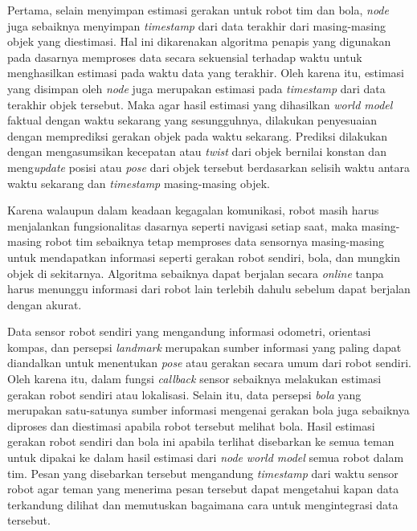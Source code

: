 Pertama, selain menyimpan estimasi gerakan untuk robot tim dan bola, \textit{node} juga sebaiknya menyimpan \textit{timestamp} dari data terakhir dari masing-masing objek yang diestimasi. Hal ini dikarenakan algoritma penapis yang digunakan pada dasarnya memproses data secara sekuensial terhadap waktu untuk menghasilkan estimasi pada waktu data yang terakhir. Oleh karena itu, estimasi yang disimpan oleh \textit{node} juga merupakan estimasi pada \textit{timestamp} dari data terakhir objek tersebut. Maka agar hasil estimasi yang dihasilkan \textit{world model} faktual dengan waktu sekarang yang sesungguhnya, dilakukan penyesuaian dengan memprediksi gerakan objek pada waktu sekarang. Prediksi dilakukan dengan mengasumsikan kecepatan atau \textit{twist} dari objek bernilai konstan dan meng\textit{update} posisi atau \textit{pose} dari objek tersebut berdasarkan selisih waktu antara waktu sekarang dan \textit{timestamp} masing-masing objek.

Karena walaupun dalam keadaan kegagalan komunikasi, robot masih harus menjalankan fungsionalitas dasarnya seperti navigasi setiap saat, maka masing-masing robot tim sebaiknya tetap memproses data sensornya masing-masing untuk mendapatkan informasi seperti gerakan robot sendiri, bola, dan mungkin objek di sekitarnya. Algoritma sebaiknya dapat berjalan secara \textit{online} tanpa harus menunggu informasi dari robot lain terlebih dahulu sebelum dapat berjalan dengan akurat.

Data sensor robot sendiri yang mengandung informasi odometri, orientasi kompas, dan persepsi \textit{landmark} merupakan sumber informasi yang paling dapat diandalkan untuk menentukan \textit{pose} atau gerakan secara umum dari robot sendiri. Oleh karena itu, dalam fungsi \textit{callback} sensor sebaiknya melakukan estimasi gerakan robot sendiri atau lokalisasi. Selain itu, data persepsi \textit{bola} yang merupakan satu-satunya sumber informasi mengenai gerakan bola juga sebaiknya diproses dan diestimasi apabila robot tersebut melihat bola. Hasil estimasi gerakan robot sendiri dan bola ini apabila terlihat disebarkan ke semua teman untuk dipakai ke dalam hasil estimasi dari \textit{node} \textit{world model} semua robot dalam tim. Pesan yang disebarkan tersebut mengandung \textit{timestamp} dari waktu sensor robot agar teman yang menerima pesan tersebut dapat mengetahui kapan data terkandung dilihat dan memutuskan bagaimana cara untuk mengintegrasi data tersebut.

